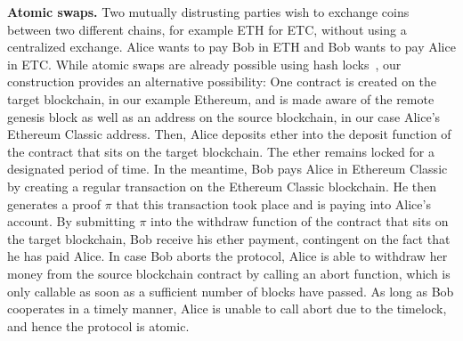 \noindent
\textbf{Atomic swaps. } Two mutually distrusting parties wish to exchange coins
between two different chains, for example ETH for ETC, without using a
centralized exchange. Alice wants to pay Bob in ETH and Bob wants to pay Alice
in ETC. While atomic swaps are already possible using hash
locks~\cite{atomicswaps,herlihy2018atomic}, our construction provides an
alternative possibility: One contract is created on the target blockchain, in
our example Ethereum, and is made aware of the remote genesis block as well as
an address on the source blockchain, in our case Alice's Ethereum Classic
address. Then, Alice deposits ether into the \textsf{deposit} function of the
contract that sits on the target blockchain. The ether remains locked for a
designated period of time. In the meantime, Bob pays Alice in Ethereum Classic
by creating a regular transaction on the Ethereum Classic blockchain. He then
generates a proof $\pi$ that this transaction took place and is paying into
Alice's account. By submitting $\pi$ into the \textsf{withdraw} function of the
contract that sits on the target blockchain, Bob receive his ether payment,
contingent on the fact that he has paid Alice. In case Bob aborts the protocol,
Alice is able to withdraw her money from the source blockchain contract by
calling an \textsf{abort} function, which is only callable as soon as a
sufficient number of blocks have passed. As long as Bob cooperates in a timely
manner, Alice is unable to call \textsf{abort} due to the timelock, and hence
the protocol is atomic.

